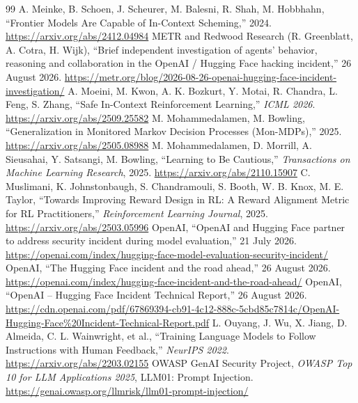 \documentclass{article}
\begin{document}
\begin{thebibliography}{99}
 A. Meinke, B. Schoen, J. Scheurer, M. Balesni, R. Shah, M. Hobbhahn, ``Frontier Models Are Capable of In-Context Scheming,'' 2024. \url{https://arxiv.org/abs/2412.04984}
 METR and Redwood Research (R. Greenblatt, A. Cotra, H. Wijk), ``Brief independent investigation of agents' behavior, reasoning and collaboration in the OpenAI / Hugging Face hacking incident,'' 26 August 2026. \url{https://metr.org/blog/2026-08-26-openai-hugging-face-incident-investigation/}
 A. Moeini, M. Kwon, A. K. Bozkurt, Y. Motai, R. Chandra, L. Feng, S. Zhang, ``Safe In-Context Reinforcement Learning,'' \emph{ICML 2026}. \url{https://arxiv.org/abs/2509.25582}
 M. Mohammedalamen, M. Bowling, ``Generalization in Monitored Markov Decision Processes (Mon-MDPs),'' 2025. \url{https://arxiv.org/abs/2505.08988}
 M. Mohammedalamen, D. Morrill, A. Sieusahai, Y. Satsangi, M. Bowling, ``Learning to Be Cautious,'' \emph{Transactions on Machine Learning Research}, 2025. \url{https://arxiv.org/abs/2110.15907}
 C. Muslimani, K. Johnstonbaugh, S. Chandramouli, S. Booth, W. B. Knox, M. E. Taylor, ``Towards Improving Reward Design in RL: A Reward Alignment Metric for RL Practitioners,'' \emph{Reinforcement Learning Journal}, 2025. \url{https://arxiv.org/abs/2503.05996}
 OpenAI, ``OpenAI and Hugging Face partner to address security incident during model evaluation,'' 21 July 2026. \url{https://openai.com/index/hugging-face-model-evaluation-security-incident/}
 OpenAI, ``The Hugging Face incident and the road ahead,'' 26 August 2026. \url{https://openai.com/index/hugging-face-incident-and-the-road-ahead/}
 OpenAI, ``OpenAI -- Hugging Face Incident Technical Report,'' 26 August 2026. \url{https://cdn.openai.com/pdf/67869394-cb91-4c12-888c-5cbd85c7814c/OpenAI-Hugging-Face\%20Incident-Technical-Report.pdf}
 L. Ouyang, J. Wu, X. Jiang, D. Almeida, C. L. Wainwright, et al., ``Training Language Models to Follow Instructions with Human Feedback,'' \emph{NeurIPS 2022}. \url{https://arxiv.org/abs/2203.02155}
 OWASP GenAI Security Project, \emph{OWASP Top 10 for LLM Applications 2025}, LLM01: Prompt Injection. \url{https://genai.owasp.org/llmrisk/llm01-prompt-injection/}

\end{thebibliography}
\end{document}
